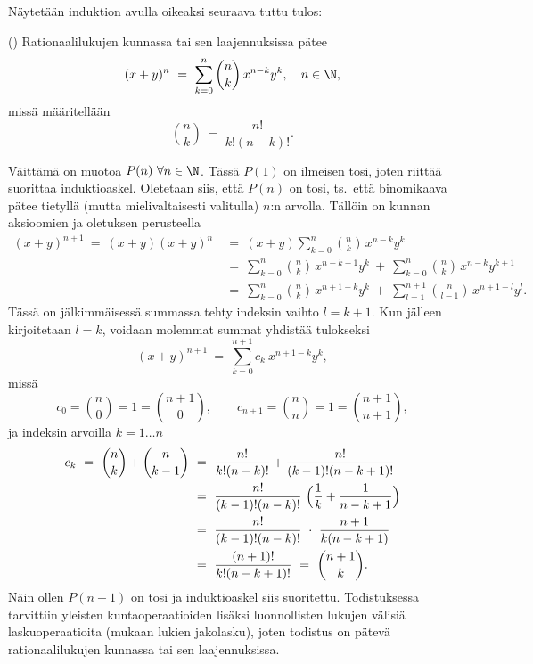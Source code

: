 Näytetään induktion avulla oikeaksi seuraava tuttu tulos:
\begin{Prop} \label{binomikaava} () 
Rationaalilukujen kunnassa tai sen laajennuksissa pätee
\[
(x+y)^n\ =\ \sum_{k=0}^n \binom{n}{k}\, x^{n-k}y^k, \quad n \in \N,
\]
missä  määritellään
\[
\binom{n}{k}\ =\ \dfrac{n!}{k!(n-k)!}.
\]
\end{Prop}
\tod Väittämä on muotoa $P(n)\ \forall n \in \N$. Tässä $P(1)$ on ilmeisen tosi, joten riittää
suorittaa induktioaskel. Oletetaan siis, että $P(n)$ on tosi, ts.\ että binomikaava pätee 
tietyllä (mutta mielivaltaisesti valitulla) $n$:n arvolla. Tällöin on kunnan aksioomien ja 
oletuksen perusteella
\begin{align*}
(x+y)^{n+1}\ =\ (x+y)(x+y)^n\ 
            &=\ (x+y) \sum_{k=0}^n \binom{n}{k}\, x^{n-k}y^k \\
            &=\ \sum_{k=0}^n \binom{n}{k}\, x^{n-k+1}y^k\ 
                                +\ \sum_{k=0}^n \binom{n}{k}\, x^{n-k}y^{k+1} \\
            &=\ \sum_{k=0}^n \binom{n}{k}\, x^{n+1-k}y^k\ 
                                +\ \sum_{l=1}^{n+1} \binom{n}{l-1}\, x^{n+1-l}y^l.
\end{align*}
Tässä on jälkimmäisessä summassa tehty indeksin vaihto $l=k+1$. Kun jälleen kirjoitetaan $l=k$,
voidaan molemmat summat yhdistää tulokseksi
\[
(x+y)^{n+1}\ =\ \sum_{k=0}^{n+1} c_k\ x^{n+1-k}y^k,
\]
missä
\[
c_0 = \binom{n}{0} = 1 = \binom{n+1}{0}, \quad \quad 
c_{n+1} = \binom{n}{n} = 1 = \binom{n+1}{n+1},
\]
ja indeksin arvoilla $k = 1 \ldots n$
\begin{align*}
c_k\ =\ \binom{n}{k} + \binom{n}{k-1}\ 
    &=\ \dfrac{n!}{k!(n-k)!} + \dfrac{n!}{(k-1)!(n-k+1)!} \\
    &=\ \dfrac{n!}{(k-1)!(n-k)!}\ \Bigl(\dfrac{1}{k} + \dfrac{1}{n-k+1} \Bigr) \\
    &=\ \dfrac{n!}{(k-1)!(n-k)!}\ \cdot\ \dfrac{n+1}{k(n-k+1)} \\
    &=\ \dfrac{(n+1)!}{k!(n-k+1)!}\ =\ \binom{n+1}{k}.
\end{align*} 
Näin ollen $P(n+1)$ on tosi ja induktioaskel siis suoritettu. Todistuksessa tarvittiin yleisten
kuntaoperaatioiden lisäksi luonnollisten lukujen välisiä laskuoperaatioita
(mukaan lukien jakolasku), joten todistus on pätevä rationaalilukujen kunnassa tai sen
laajennuksissa. \loppu

